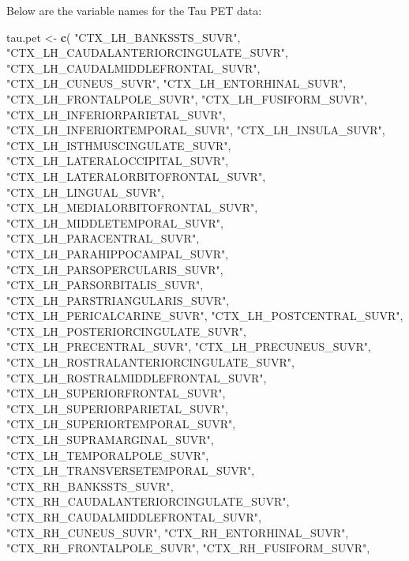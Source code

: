 \documentclass[
]{article}
\newenvironment{Shaded}{\begin{snugshade}}{\end{snugshade}}
\newcommand{\KeywordTok}[1]{\textcolor[rgb]{0.13,0.29,0.53}{\textbf{#1}}}
\newcommand{\NormalTok}[1]{#1}
\newcommand{\StringTok}[1]{\textcolor[rgb]{0.31,0.60,0.02}{#1}}
\begin{document}
Below are the variable names for the Tau PET data:

\begin{Shaded}
\begin{Highlighting}[]
\NormalTok{tau.pet <-}\StringTok{ }\KeywordTok{c}\NormalTok{(}
  \StringTok{"CTX_LH_BANKSSTS_SUVR"}\NormalTok{, }\StringTok{"CTX_LH_CAUDALANTERIORCINGULATE_SUVR"}\NormalTok{,}
  \StringTok{"CTX_LH_CAUDALMIDDLEFRONTAL_SUVR"}\NormalTok{, }\StringTok{"CTX_LH_CUNEUS_SUVR"}\NormalTok{,                  }
  \StringTok{"CTX_LH_ENTORHINAL_SUVR"}\NormalTok{, }\StringTok{"CTX_LH_FRONTALPOLE_SUVR"}\NormalTok{,           }
  \StringTok{"CTX_LH_FUSIFORM_SUVR"}\NormalTok{, }\StringTok{"CTX_LH_INFERIORPARIETAL_SUVR"}\NormalTok{,        }
  \StringTok{"CTX_LH_INFERIORTEMPORAL_SUVR"}\NormalTok{, }\StringTok{"CTX_LH_INSULA_SUVR"}\NormalTok{,                  }
  \StringTok{"CTX_LH_ISTHMUSCINGULATE_SUVR"}\NormalTok{, }\StringTok{"CTX_LH_LATERALOCCIPITAL_SUVR"}\NormalTok{,        }
  \StringTok{"CTX_LH_LATERALORBITOFRONTAL_SUVR"}\NormalTok{, }\StringTok{"CTX_LH_LINGUAL_SUVR"}\NormalTok{,       }
  \StringTok{"CTX_LH_MEDIALORBITOFRONTAL_SUVR"}\NormalTok{, }\StringTok{"CTX_LH_MIDDLETEMPORAL_SUVR"}\NormalTok{,          }
  \StringTok{"CTX_LH_PARACENTRAL_SUVR"}\NormalTok{, }\StringTok{"CTX_LH_PARAHIPPOCAMPAL_SUVR"}\NormalTok{,         }
  \StringTok{"CTX_LH_PARSOPERCULARIS_SUVR"}\NormalTok{, }\StringTok{"CTX_LH_PARSORBITALIS_SUVR"}\NormalTok{,        }
  \StringTok{"CTX_LH_PARSTRIANGULARIS_SUVR"}\NormalTok{, }\StringTok{"CTX_LH_PERICALCARINE_SUVR"}\NormalTok{,          }
  \StringTok{"CTX_LH_POSTCENTRAL_SUVR"}\NormalTok{, }\StringTok{"CTX_LH_POSTERIORCINGULATE_SUVR"}\NormalTok{,     }
  \StringTok{"CTX_LH_PRECENTRAL_SUVR"}\NormalTok{, }\StringTok{"CTX_LH_PRECUNEUS_SUVR"}\NormalTok{,     }
  \StringTok{"CTX_LH_ROSTRALANTERIORCINGULATE_SUVR"}\NormalTok{, }\StringTok{"CTX_LH_ROSTRALMIDDLEFRONTAL_SUVR"}\NormalTok{,   }
  \StringTok{"CTX_LH_SUPERIORFRONTAL_SUVR"}\NormalTok{, }\StringTok{"CTX_LH_SUPERIORPARIETAL_SUVR"}\NormalTok{,   }
  \StringTok{"CTX_LH_SUPERIORTEMPORAL_SUVR"}\NormalTok{, }\StringTok{"CTX_LH_SUPRAMARGINAL_SUVR"}\NormalTok{,       }
  \StringTok{"CTX_LH_TEMPORALPOLE_SUVR"}\NormalTok{, }\StringTok{"CTX_LH_TRANSVERSETEMPORAL_SUVR"}\NormalTok{,      }
  \StringTok{"CTX_RH_BANKSSTS_SUVR"}\NormalTok{,     }
  \StringTok{"CTX_RH_CAUDALANTERIORCINGULATE_SUVR"}\NormalTok{, }\StringTok{"CTX_RH_CAUDALMIDDLEFRONTAL_SUVR"}\NormalTok{,    }
  \StringTok{"CTX_RH_CUNEUS_SUVR"}\NormalTok{, }\StringTok{"CTX_RH_ENTORHINAL_SUVR"}\NormalTok{,    }
  \StringTok{"CTX_RH_FRONTALPOLE_SUVR"}\NormalTok{, }\StringTok{"CTX_RH_FUSIFORM_SUVR"}\NormalTok{,             }

\end{Highlighting}
\end{Shaded}
\end{document}
